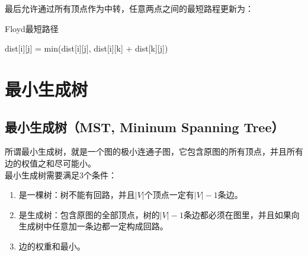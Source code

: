 最后允许通过所有顶点作为中转，任意两点之间的最短路程更新为：

\begin{table}[H]
	\centering
\end{table}

\begin{algorithm}[H]
	\caption{Floyd最短路径}
	\begin{algorithmic}[1]
		\State dist[i][j] = min(dist[i][j], dist[i][k] + dist[k][j])
		\EndFor
		\EndFor
		\EndFor
		\EndProcedure
	\end{algorithmic}
\end{algorithm}

\newpage

\section{最小生成树}

\subsection{最小生成树（MST, Mininum Spanning Tree）}

所谓最小生成树，就是一个图的极小连通子图，它包含原图的所有顶点，并且所有边的权值之和尽可能小。\\

最小生成树需要满足3个条件：

\begin{enumerate}
	\item 是一棵树：树不能有回路，并且$ |V| $个顶点一定有$ |V| - 1 $条边。

	\item 是生成树：包含原图的全部顶点，树的$ |V| - 1 $条边都必须在图里，并且如果向生成树中任意加一条边都一定构成回路。

	\item 边的权重和最小。
\end{enumerate}

